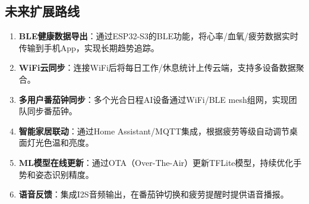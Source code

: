 \documentclass[UTF8,a4paper,12pt]{ctexart}
\begin{document}
\subsection{未来扩展路线}

\begin{enumerate}[label=(\arabic*),leftmargin=*]
    \item \textbf{BLE健康数据导出}：通过ESP32-S3的BLE功能，将心率/血氧/疲劳数据实时传输到手机App，实现长期趋势追踪。
    \item \textbf{WiFi云同步}：连接WiFi后将每日工作/休息统计上传云端，支持多设备数据聚合。
    \item \textbf{多用户番茄钟同步}：多个光合日程AI设备通过WiFi/BLE mesh组网，实现团队同步番茄钟。
    \item \textbf{智能家居联动}：通过Home Assistant/MQTT集成，根据疲劳等级自动调节桌面灯光色温和亮度。
    \item \textbf{ML模型在线更新}：通过OTA（Over-The-Air）更新TFLite模型，持续优化手势和姿态识别精度。
    \item \textbf{语音反馈}：集成I2S音频输出，在番茄钟切换和疲劳提醒时提供语音播报。
\end{enumerate}
\end{document}
